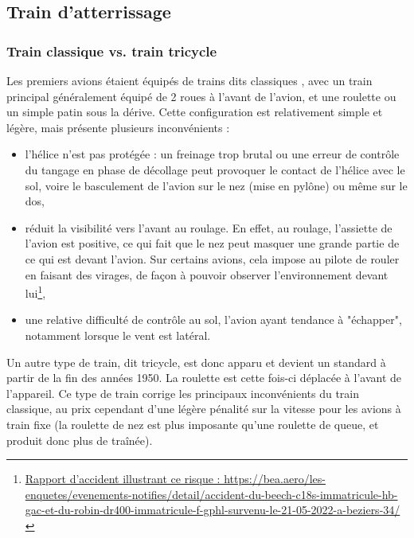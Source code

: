 	\subsection{Train d'atterrissage}
	\subsubsection{Train classique vs. train tricycle}
	Les premiers avions étaient équipés de trains dits classiques , avec un train principal généralement équipé de 2 roues à l'avant de l'avion, et une roulette ou un simple patin sous la dérive. Cette configuration est relativement simple et légère, mais présente plusieurs inconvénients :
	\begin{itemize}
		\item l'hélice n'est pas protégée : un freinage trop brutal ou une erreur de contrôle du tangage en phase de décollage peut provoquer le contact de l'hélice avec le sol, voire le basculement de l'avion sur le nez (mise en pylône) ou même sur le dos,
		\item réduit la visibilité vers l'avant au roulage. En effet, au roulage, l'assiette de l'avion est positive, ce qui fait que le nez peut masquer une grande partie de ce qui est devant l'avion. Sur certains avions, cela impose au pilote de rouler en faisant des virages, de façon à pouvoir observer l'environnement devant lui\footnote{\href{https://bea.aero/les-enquetes/evenements-notifies/detail/accident-du-beech-c18s-immatricule-hb-gac-et-du-robin-dr400-immatricule-f-gphl-survenu-le-21-05-2022-a-beziers-34/}{Rapport d'accident illustrant ce risque : https://bea.aero/les-enquetes/evenements-notifies/detail/accident-du-beech-c18s-immatricule-hb-gac-et-du-robin-dr400-immatricule-f-gphl-survenu-le-21-05-2022-a-beziers-34/}},
		\item une relative difficulté de contrôle au sol, l'avion ayant tendance à "échapper", notamment lorsque le vent est latéral.
	\end{itemize}
	
	Un autre type de train, dit tricycle, est donc apparu et devient un standard à partir de la fin des années 1950. La roulette est cette fois-ci déplacée à l'avant de l'appareil. Ce type de train corrige les principaux inconvénients du train classique, au prix cependant d'une légère pénalité sur la vitesse pour les avions à train fixe (la roulette de nez est plus imposante qu'une roulette de queue, et produit donc plus de traînée).
	
